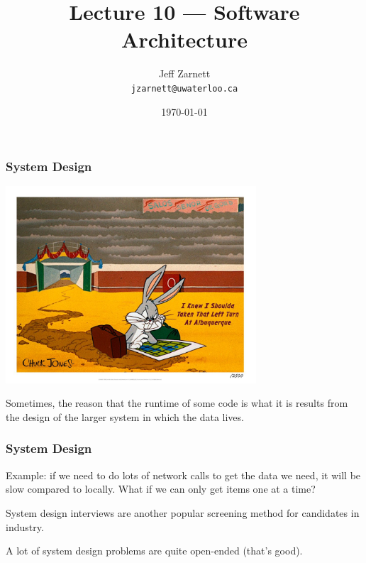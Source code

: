 


\title{Lecture 10 --- Software Architecture}

\author{Jeff Zarnett\\ \small \texttt{jzarnett@uwaterloo.ca}}
\date{\today}




\begin{frame}
  \titlepage
 \end{frame}
 
 
\begin{frame}
\frametitle{System Design}

\begin{center}
	\includegraphics[width=0.7\textwidth]{images/abq.jpg}
\end{center}

Sometimes, the reason that the runtime of some code is what it is results from the design of the larger system in which the data lives.

\end{frame}

\begin{frame}
\frametitle{System Design}
Example: if we need to do lots of network calls to get the data we need, it will be slow compared to locally. What if we can only get items one at a time?

System design interviews are another popular screening method for candidates in industry.

A lot of system design problems are quite open-ended (that's good).

\end{frame}

